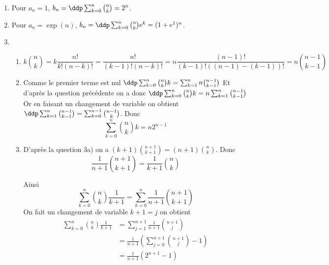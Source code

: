 \documentclass[a4paper, 11pt,reqno]{article}
\begin{document}
\begin{correction}

\begin{enumerate}
\item Pour $a_n=1$, $b_n=\ddp \sum_{k=0}^n \binom{n}{k}  =2^n$.
\item  Pour $a_n=\exp(n)$, $b_n=\ddp \sum_{k=0}^n \binom{n}{k}e^k  =(1+e^1)^n$.
\item
\begin{enumerate}
\item  $$k\binom{n}{k}= k \frac{n! }{k! (n-k)!} = \frac{n! }{(k-1)! (n-k)!}  = n \frac{(n-1)! }{(k-1)! ((n-1)-(k-1))!}=  n\binom{n-1}{k-1}$$
\item
Comme le premier terme est nul  $\ddp \sum_{k=0}^n \binom{n}{k} k = \sum_{k=1}^n n\binom{n-1}{k-1}$
Et d'après la question précédente on a donc $ \ddp \sum_{k=0}^n \binom{n}{k} k= n  \sum_{k=1}^n \binom{n-1}{k-1}$
Or en faisant un changement de variable on obtient $\ddp \sum_{k=1}^n \binom{n-1}{k-1}= \sum_{k=0}^{n-1} \binom{n-1}{k}$. 
Donc $$ \sum_{k=0}^n \binom{n}{k} k = n 2^{n-1}$$

\item 
D'après la question 3a) on a $ (k+1)\binom{n+1}{k+1} = (n+1)\binom{n}{k}$. Donc 
$$\frac{1}{n+1}\binom{n+1}{k+1} =\frac{1}{k+1}\binom{n}{k}$$

Ainsi $$\sum_{k=0}^n \binom{n}{k} \frac{1}{k+1} = \sum_{k=0}^{n} \frac{1}{n+1}\binom{n+1}{k+1}$$
On fait un changement de variable $k+1=j$ on obtient 
\begin{align*}
\sum_{k=0}^n \binom{n}{k} \frac{1}{k+1} &=  \sum_{j=1}^{n+1} \frac{1}{n+1}\binom{n+1}{j}\\
															&=  \frac{1}{n+1} \left( \sum_{j=0}^{n+1} \binom{n+1}{j} -1\right)\\
															&= \frac{1}{n+1} \left( 2^{n+1}-1\right)
\end{align*}
\end{enumerate}
\end{enumerate}
\end{correction}


\vspace{0.5cm}
\end{document}
